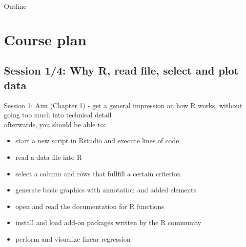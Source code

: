 \documentclass[xcolor=table,       handout,    xcolor=dvipsnames]{beamer}\usepackage[]{graphicx}\usepackage[]{color}
\begin{document}

\begin{frame}{Outline}
\tableofcontents[hideallsubsections]
\label{toc}
\end{frame}

\section{Course plan}

\subsection{Session 1/4: Why R, read file, select and plot data}

\begin{frame}{Session 1: Aim (Chapter 1)}
\pause - get a general impression on how R works, without going too much into technical detail\\
\pause afterwards, you should be able to:
\pause
\begin{itemize}[<+->]
\item start a new script in Rstudio and execute lines of code
\item read a data file into R
\item select a column and rows that fullfill a certain criterion
\item generate basic graphics with annotation and added elements
\item open and read the documentation for R functions
\item install and load add-on packages written by the R community
\item perform and visualize linear regression
\end{itemize}
\end{frame}

\end{document}

